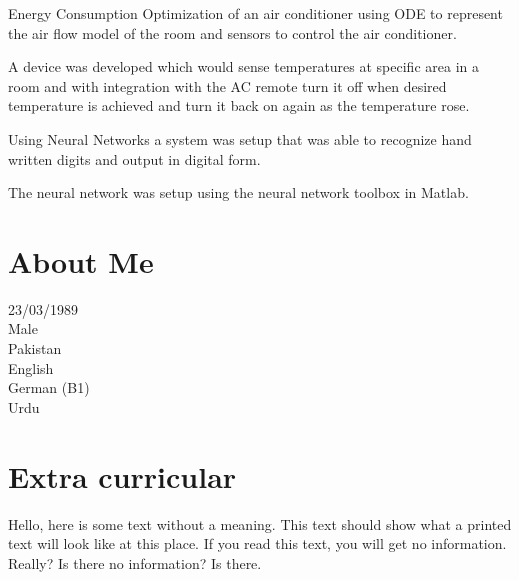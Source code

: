 \documentclass[letterpaper]{deedy-resume} %
\begin{document}
\begin{minipage}[t]{0.66\textwidth}
\begin{tightitemize}
\item Energy Consumption Optimization of an air conditioner using ODE to represent the air
flow model of the room and sensors to control the air conditioner.
\item A device was developed which would sense temperatures at specific area in a room and with integration with the AC remote turn it off when desired temperature is achieved and turn it back on again as the temperature rose.
\end{tightitemize}

\sectionspace %


\descript{}

\begin{tightitemize}
\item Using Neural Networks a system was setup that was able to recognize hand written digits and output in digital form.
\item The neural network was setup using the neural network toolbox in Matlab.
\end{tightitemize}

\sectionspace %


\begin{multicols}{2}
\section{About Me}   
23/03/1989 \\
Male \\
Pakistan \\
\textbullet{} English \\
\textbullet{} German  (B1) \\
\textbullet{} Urdu \\

\columnbreak

\section{Extra curricular} 
Hello, here is some text without a meaning.  This text should show what a printed text will look like at this place.
If you read this text, you will get no information.  Really?  Is there no information?  Is there.

\end{multicols}


\end{minipage} %

\end{document}
